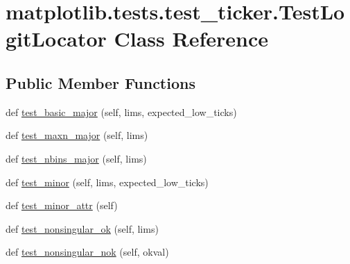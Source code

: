 \hypertarget{classmatplotlib_1_1tests_1_1test__ticker_1_1TestLogitLocator}{}\section{matplotlib.\+tests.\+test\+\_\+ticker.\+Test\+Logit\+Locator Class Reference}
\label{classmatplotlib_1_1tests_1_1test__ticker_1_1TestLogitLocator}
\subsection*{Public Member Functions}
\begin{DoxyCompactItemize}
\item 
def \hyperlink{classmatplotlib_1_1tests_1_1test__ticker_1_1TestLogitLocator_a012690a1ca244cef6e2241152279dd06}{test\+\_\+basic\+\_\+major} (self, lims, expected\+\_\+low\+\_\+ticks)
\item 
def \hyperlink{classmatplotlib_1_1tests_1_1test__ticker_1_1TestLogitLocator_a6e98679329084df7e8db6d821eda4aa6}{test\+\_\+maxn\+\_\+major} (self, lims)
\item 
def \hyperlink{classmatplotlib_1_1tests_1_1test__ticker_1_1TestLogitLocator_a7a5cb740e99fd2666a93e6921d37590e}{test\+\_\+nbins\+\_\+major} (self, lims)
\item 
def \hyperlink{classmatplotlib_1_1tests_1_1test__ticker_1_1TestLogitLocator_aa05a2c84f49ef330f89d3f9f46acd4e2}{test\+\_\+minor} (self, lims, expected\+\_\+low\+\_\+ticks)
\item 
def \hyperlink{classmatplotlib_1_1tests_1_1test__ticker_1_1TestLogitLocator_a0b70e4a8422eb80dc512a6abc6a11aac}{test\+\_\+minor\+\_\+attr} (self)
\item 
def \hyperlink{classmatplotlib_1_1tests_1_1test__ticker_1_1TestLogitLocator_a5aa3edee915219698430f5c0470312f5}{test\+\_\+nonsingular\+\_\+ok} (self, lims)
\item 
def \hyperlink{classmatplotlib_1_1tests_1_1test__ticker_1_1TestLogitLocator_a413bc809341175150221a81d5ab868a4}{test\+\_\+nonsingular\+\_\+nok} (self, okval)
\end{DoxyCompactItemize}
